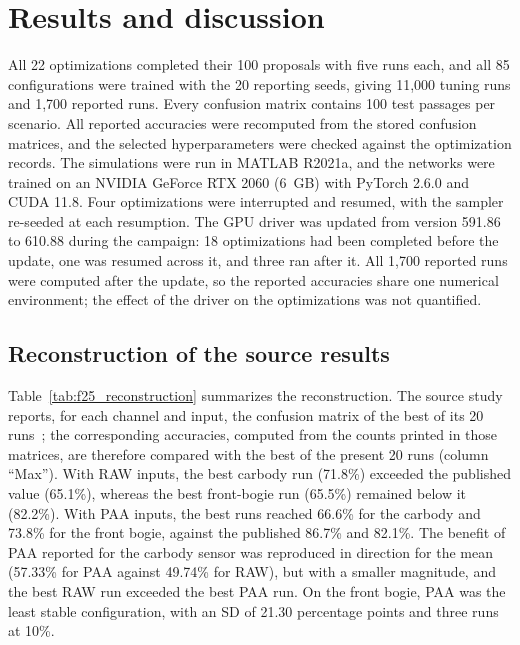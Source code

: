\section{Results and discussion}
\label{sec:results}

All 22 optimizations completed their 100 proposals with five runs each, and all
85 configurations were trained with the 20 reporting seeds, giving 11,000
tuning runs and 1,700 reported runs. Every confusion matrix contains 100 test
passages per scenario. All reported accuracies were recomputed from the stored
confusion matrices, and the selected hyperparameters were checked against the
optimization records. The simulations were run in MATLAB R2021a, and the
networks were trained on an NVIDIA GeForce RTX 2060 (6~GB) with PyTorch 2.6.0
and CUDA 11.8. Four optimizations were interrupted and resumed, with the
sampler re-seeded at each resumption. The GPU driver was updated from version
591.86 to
610.88 during the campaign: 18 optimizations had been completed before the
update, one was resumed across it, and three ran after it. All 1,700 reported
runs were computed after the update, so the reported accuracies share one
numerical environment; the effect of the driver on the optimizations was not
quantified.

\subsection{Reconstruction of the source results}
\label{sec:reconstruction}

Table~\ref{tab:f25_reconstruction} summarizes the reconstruction. The source
study reports, for each channel and input, the confusion matrix of the best of
its 20 runs~\cite{fernandes2025early}; the corresponding accuracies, computed
from the counts printed in those matrices, are therefore compared with the best
of the present 20 runs (column ``Max''). With RAW inputs, the best carbody run (71.8\%) exceeded
the published value (65.1\%), whereas the best front-bogie run (65.5\%)
remained below it (82.2\%). With PAA inputs, the best runs reached 66.6\% for
the carbody and 73.8\% for the front bogie, against the published 86.7\% and
82.1\%. The benefit of PAA reported for the carbody sensor was reproduced in
direction for the mean (57.33\% for PAA against 49.74\% for RAW), but with a
smaller magnitude, and the best RAW run exceeded the best PAA run. On the front
bogie, PAA was the least stable configuration, with an SD of 21.30 percentage
points and three runs at 10\%.

